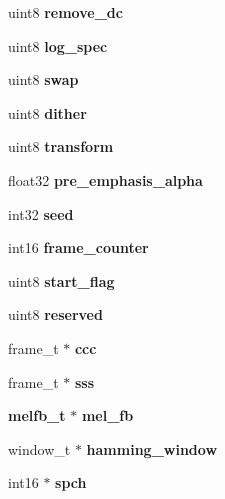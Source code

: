 \begin{DoxyCompactItemize}
\item 
uint8 {\bfseries remove\-\_\-dc}\label{structfe__s_ac575bed8a61105f4302bd27246d4c33d}

\item 
uint8 {\bfseries log\-\_\-spec}\label{structfe__s_a7d3d6513ae6b60632d14c1e1d5dfe891}

\item 
uint8 {\bfseries swap}\label{structfe__s_ab08200d2bfc6d868536d802501525179}

\item 
uint8 {\bfseries dither}\label{structfe__s_abd7b32a70dc6512134e39dd54d160689}

\item 
uint8 {\bfseries transform}\label{structfe__s_a49f2e495d938acaf5c918059e99854e2}

\item 
float32 {\bfseries pre\-\_\-emphasis\-\_\-alpha}\label{structfe__s_aa7dc496e33955b7f06f83715c05ded8e}

\item 
int32 {\bfseries seed}\label{structfe__s_a0f42573b9f0ce0247181c5dd79e16b67}

\item 
int16 {\bfseries frame\-\_\-counter}\label{structfe__s_a8df2a5203ac64d1dc619f99a35dd38fd}

\item 
uint8 {\bfseries start\-\_\-flag}\label{structfe__s_aa05ae3633c2b33e77a7b8b90e769176b}

\item 
uint8 {\bfseries reserved}\label{structfe__s_a18670c79bc0cd9848fdf4711c5094542}

\item 
frame\-\_\-t $\ast$ {\bfseries ccc}\label{structfe__s_afc472de43bd747de659dd57bc9a74fae}

\item 
frame\-\_\-t $\ast$ {\bfseries sss}\label{structfe__s_a6525c59397073d363e1844c28746fcb9}

\item 
{\bf melfb\-\_\-t} $\ast$ {\bfseries mel\-\_\-fb}\label{structfe__s_ae5a054dbac5e32cf028b6d6d4c9391bd}

\item 
window\-\_\-t $\ast$ {\bfseries hamming\-\_\-window}\label{structfe__s_ad47433337a370e452070ffddce87e474}

\item 
int16 $\ast$ {\bfseries spch}\label{structfe__s_a7d49693c1fa1b14bbcd25b87ad97935b}


\end{DoxyCompactItemize}
